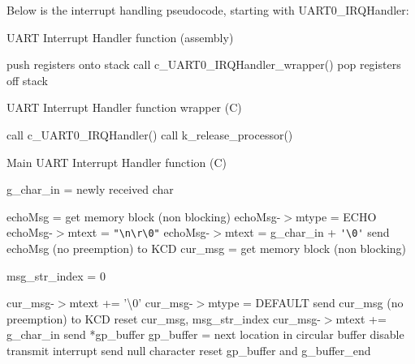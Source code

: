 \documentclass[12pt]{report}
\begin{document}
Below is the interrupt handling pseudocode, starting with UART0_IRQHandler:
\begin{algorithm}[H]
	\caption{UART Interrupt Handler function (assembly)}
	\begin{algorithmic}[1]
	    \State push registers onto stack
	    \State call c_UART0_IRQHandler_wrapper()
	    \State pop registers off stack
	  \EndFunction
	\end{algorithmic}
\end{algorithm}

\begin{algorithm}[H]
	\caption{UART Interrupt Handler function wrapper (C)}
	\begin{algorithmic}[1]
	    \State call c_UART0_IRQHandler()
	      \State call k_release_processor()
	    \EndIf
	  \EndFunction
	\end{algorithmic}
\end{algorithm}

\begin{algorithm}[H]
	\caption{Main UART Interrupt Handler function (C)}
	\begin{algorithmic}[1]
	      \State g_char_in = newly received char
	        \State\Return
	      \EndIf

	      \State echoMsg = get memory block (non blocking)
	        \State echoMsg-$>$mtype = ECHO
	          \State echoMsg-$>$mtext = \verb|"\n\r\0"|
	        \Else
	          \State echoMsg-$>$mtext = g_char_in + \verb|'\0'|
	        \EndIf
	        \State send echoMsg (no preemption) to KCD
	      \EndIf
	        \State cur_msg = get memory block (non blocking)
	          \State\Return
	        \EndIf

	        \State msg_str_index = 0
	      \EndIf

	        \State cur_msg-$>$mtext += '\textbackslash 0'
	        \State cur_msg-$>$mtype = DEFAULT
	        \State send cur_msg (no preemption) to KCD
	        \State reset cur_msg, msg_str_index
	      \Else
	        \State cur_msg-$>$mtext += g_char_in
	      \EndIf
	        \State send *gp_buffer
	        \State gp_buffer = next location in circular buffer
	      \Else
	        \State disable transmit interrupt
	        \State send null character
	        \State reset gp_buffer and g_buffer_end
	      \EndIf
	    \EndIf
	  \EndFunction
	\end{algorithmic}
\end{algorithm}
\end{document}
